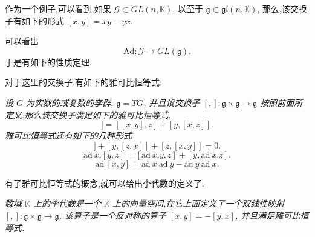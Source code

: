 作为一个例子,可以看到,如果 $\mathcal{G} \subset GL(n, \mathbb{K})$, 以至于 $\mathfrak{g} \subset \mathfrak{gl}(n, \mathbb{K})$, 那么,该交换子有如下的形式 $[x, y] = xy − yx$.

可以看出
\begin{equation*}
	\mbox{Ad}:\mathcal{G}\to GL(\mathfrak{g}).
\end{equation*}
于是有如下的性质定理.


对于这里的交换子,有如下的雅可比恒等式:
\begin{theorem}
	\emph{设 $G$ 为实数的或复数的李群, $\mathfrak{g}=TG$, 并且设交换子 $[,]:\mathfrak{g}\times\mathfrak{g}\to \mathfrak{g}$ 按照前面所定义.那么该交换子满足如下的雅可比恒等式.
	\begin{equation*}
		[x, [y, z]] = [[x, y], z] + [y, [x, z]].
	\end{equation*}
	雅可比恒等式还有如下的几种形式
	\begin{equation*}
		[x, [y, z]] + [y, [z, x]] + [z, [x, y]] = 0.
	\end{equation*}
	\begin{equation*}
		\mbox{ad}~x.[y, z] = [\mbox{ad}~x.y, z] + [y, \mbox{ad}~x.z].
	\end{equation*}
	\begin{equation*}
		\mbox{ad}~[x, y] = \mbox{ad}~x~\mbox{ad}~y − \mbox{ad}~y~\mbox{ad}~x.
	\end{equation*}}
\end{theorem}

有了雅可比恒等式的概念,就可以给出李代数的定义了.
\begin{definition}[李代数]
	\emph{数域 $\mathbb{K}$ 上的李代数是一个 $\mathbb{K}$ 上的向量空间,在它上面定义了一个双线性映射 $[,]:\mathfrak{g}\times\mathfrak{g}\to \mathfrak{g}$, 该算子是一个反对称的算子 $[x, y] = −[y, x]$, 并且满足雅可比恒等式.}
\end{definition}

